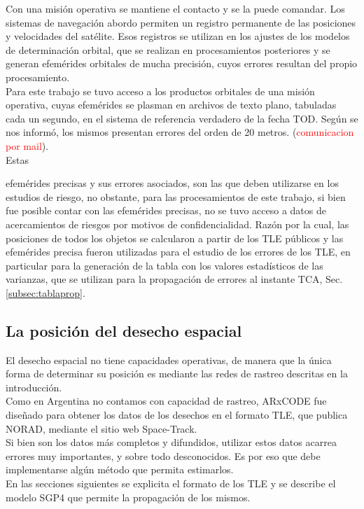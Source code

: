 Con una misi\'on operativa se mantiene el contacto y se la puede comandar. Los sistemas de navegaci\'on abordo permiten un registro permanente de las posiciones y velocidades del sat\'elite. Esos registros se utilizan en los ajustes de los modelos de determinaci\'on orbital, que se realizan en procesamientos posteriores y se generan efem\'erides orbitales de mucha precisi\'on, cuyos errores resultan del propio procesamiento.\\
Para este trabajo se tuvo acceso a los productos orbitales de una misi\'on operativa, cuyas efem\'erides se plasman en archivos de texto plano, tabuladas cada un segundo, en el sistema de referencia verdadero de la fecha TOD. Seg\'un se nos inform\'o, los mismos presentan errores del orden de  20 metros. (\textcolor{red}{comunicacion por mail}).\\
Estas {efem\'erides precisas y sus errores asociados, son las que deben utilizarse en los estudios de riesgo, no obstante, para las procesamientos de este trabajo, si bien fue posible contar con las efem\'erides precisas, no se tuvo acceso a datos de acercamientos de riesgos por motivos de confidencialidad. Raz\'on por la cual, las posiciones de todos los objetos se calcularon a partir de los TLE p\'ublicos y las efem\'erides precisa fueron utilizadas para el estudio de los errores de los TLE, en particular para la generaci\'on de la tabla con los valores estad\'isticos de las varianzas, que se utilizan para la propagaci\'on de errores al instante TCA, Sec. \ref{subsec:tablaprop}. \\

\subsection{La posici\'on del desecho espacial}
El desecho espacial no tiene capacidades operativas, de manera que la \'unica forma de determinar su posici\'on es mediante las redes de rastreo descritas en la introducci\'on.\\
Como en Argentina no contamos con capacidad de rastreo, ARxCODE fue dise\~nado para obtener los datos de los desechos en el formato TLE, que publica NORAD, mediante el sitio web Space-Track.\\
Si bien son los datos m\'as completos y difundidos, utilizar estos datos acarrea errores muy importantes, y sobre todo desconocidos. Es por eso que debe implementarse alg\'un m\'etodo que permita estimarlos.\\

En las secciones siguientes se explicita el formato de los TLE y se describe el modelo SGP4 que permite la propagaci\'on de los mismos.\\

}
